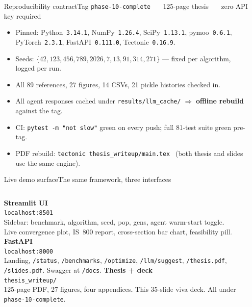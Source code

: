 \documentclass[aspectratio=169]{beamer}
\begin{document}
\begin{frame}{Reproducibility contract}{Tag \texttt{phase-10-complete} \ \textbullet\ \ 125-page thesis \ \textbullet\ \ zero API key required}
  \small
  \begin{itemize}\setlength\itemsep{0.4em}
    \item Pinned: Python~\texttt{3.14.1}, NumPy~\texttt{1.26.4}, SciPy~\texttt{1.13.1}, pymoo~\texttt{0.6.1}, PyTorch~\texttt{2.3.1}, FastAPI~\texttt{0.111.0}, Tectonic~\texttt{0.16.9}.
    \item Seeds: $\{42,123,456,789,2026,7,13,91,314,271\}$ --- fixed per algorithm, logged per run.
    \item All 89 references, 27 figures, 14 CSVs, 21 pickle histories checked in.
    \item All agent responses cached under \texttt{results/llm\_cache/} $\Rightarrow$ \textbf{offline rebuild} against the tag.
    \item CI: \texttt{pytest -m "not slow"} green on every push; full 81-test suite green pre-tag.
    \item PDF rebuild: \texttt{tectonic thesis\_writeup/main.tex} \ (both thesis and slides use the same engine).
  \end{itemize}
\end{frame}

\begin{frame}{Live demo surface}{The same framework, three interfaces}
  \small
  \begin{columns}[T,onlytextwidth]
      \textbf{Streamlit UI}\\
      \footnotesize\texttt{localhost:8501}\\[0.3em]
      Sidebar: benchmark, algorithm, seed, pop, gens, agent warm-start toggle.\\
      Live convergence plot, IS~800 report, cross-section bar chart, feasibility pill.
      \textbf{FastAPI}\\
      \footnotesize\texttt{localhost:8000}\\[0.3em]
      Landing, \texttt{/status}, \texttt{/benchmarks}, \texttt{/optimize}, \texttt{/llm/suggest}, \texttt{/thesis.pdf}, \texttt{/slides.pdf}. Swagger at \texttt{/docs}.
      \textbf{Thesis + deck}\\
      \footnotesize\texttt{thesis\_writeup/}\\[0.3em]
      125-page PDF, 27 figures, four appendices. This 35-slide viva deck. All under \texttt{phase-10-complete}.
  \end{columns}
\end{frame}
\end{document}
